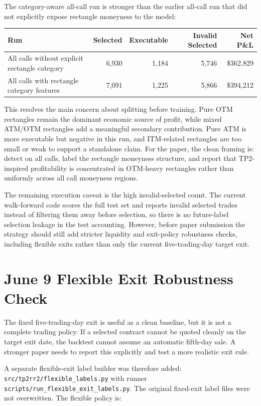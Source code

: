 \documentclass[11pt]{article}
\begin{document}
The category-aware all-call run is stronger than the earlier all-call run that
did not explicitly expose rectangle moneyness to the model:

\begin{center}
\begin{tabular}{lrrrr}
\toprule
Run & Selected & Executable & Invalid Selected & Net P\&L \\
\midrule
All calls without explicit rectangle category & 6,930 & 1,184 & 5,746 & \$362,829 \\
All calls with rectangle category features & 7,091 & 1,225 & 5,866 & \$394,212 \\
\bottomrule
\end{tabular}
\end{center}

This resolves the main concern about splitting before training. Pure OTM
rectangles remain the dominant economic source of profit, while mixed ATM/OTM
rectangles add a meaningful secondary contribution. Pure ATM is more executable
but negative in this run, and ITM-related rectangles are too small or weak to
support a standalone claim. For the paper, the clean framing is: detect on all
calls, label the rectangle moneyness structure, and report that TP2-inspired
profitability is concentrated in OTM-heavy rectangles rather than uniformly
across all call moneyness regions.

The remaining execution caveat is the high invalid-selected count. The current
walk-forward code scores the full test set and reports invalid selected trades
instead of filtering them away before selection, so there is no future-label
selection leakage in the test accounting. However, before paper submission the
strategy should still add stricter liquidity and exit-policy robustness checks,
including flexible exits rather than only the current five-trading-day target
exit.

\section*{June 9 Flexible Exit Robustness Check}

The fixed five-trading-day exit is useful as a clean baseline, but it is not a
complete trading policy. If a selected contract cannot be quoted cleanly on the
target exit date, the backtest cannot assume an automatic fifth-day sale. A
stronger paper needs to report this explicitly and test a more realistic exit
rule.

A separate flexible-exit label builder was therefore added:
\texttt{src/tp2rr2/flexible\_labels.py} with runner
\texttt{scripts/run\_flexible\_exit\_labels.py}. The original fixed-exit label
files were not overwritten. The flexible policy is:
\end{document}
